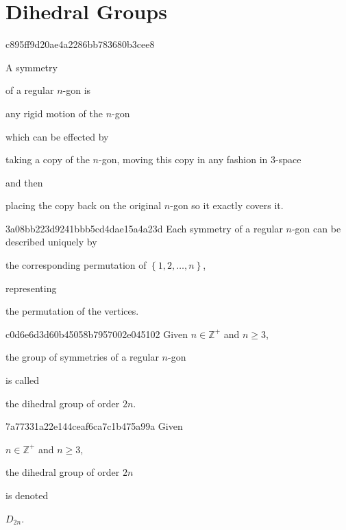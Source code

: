 \section{Dihedral Groups}
\begin{note}{c895ff9d20ae4a2286bb783680b3cee8}
    \begin{icloze}{1}A symmetry\end{icloze} of a regular \({ n }\)-gon is \begin{icloze}{2}any rigid motion of the \({ n }\)-gon\end{icloze} which can be effected by \begin{icloze}{3}taking a copy of the \({ n }\)-gon, moving this copy in any fashion in \({ 3 }\)-space\end{icloze} and then \begin{icloze}{4}placing the copy back on the original \({ n }\)-gon so it exactly covers it.\end{icloze}
\end{note}

\begin{note}{3a08bb223d9241bbb5cd4dae15a4a23d}
    Each symmetry of a regular \({ n }\)-gon can be described uniquely by \begin{icloze}{1}the corresponding permutation of \({ \left\{ 1, 2, \ldots, n \right\} }\),\end{icloze} representing \begin{icloze}{2}the permutation of the vertices.\end{icloze}
\end{note}

\begin{note}{c0d6e6d3d60b45058b7957002e045102}
   Given \({ n \in \mathbb Z^{+} }\) and \({ n \geq 3 }\),
   \begin{icloze}{2}the group of symmetries of a regular \({ n }\)-gon\end{icloze} is called \begin{icloze}{1}the dihedral group of order \({ 2n }\).\end{icloze}
\end{note}

\begin{note}{7a77331a22e144ceaf6ca7c1b475a99a}
    Given \begin{icloze}{3}\({ n \in \mathbb Z^{+} }\) and \({ n \geq 3 }\),\end{icloze}
    \begin{icloze}{1}the dihedral group of order \({ 2n }\)\end{icloze} is denoted \begin{icloze}{2}\({ D_{2n} }\).\end{icloze}
\end{note}

